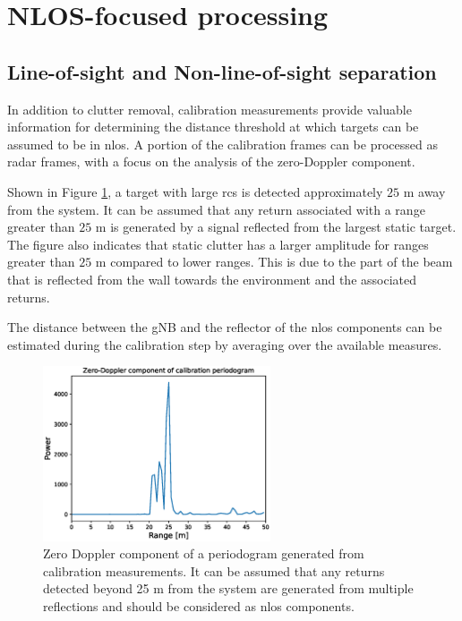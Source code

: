 	\section{NLOS-focused processing}
	\label{sec:nlos_proc_pipeline}
	
		\subsection{Line-of-sight and Non-line-of-sight separation}
		\label{sec:los_nlos_separation}
		
		
		
			In addition to clutter removal, calibration measurements provide valuable information for determining the distance threshold at which targets can be assumed to be in \gls{nlos}. 
			A portion of the calibration frames can be processed as radar frames, with a focus on the analysis of the zero-Doppler component.
			
			Shown in Figure \ref{fig:Test1_cali_static_per}, a target with large \gls{rcs} is detected approximately $25$ m away from the system. It can be assumed that any return associated with a range greater than $25$ m is generated by a signal reflected from the largest static target. The figure also indicates that static clutter has a larger amplitude for ranges greater than $25$ m compared to lower ranges. This is due to the part of the beam that is reflected from the wall towards the environment and the associated returns.
			
			The distance between the gNB and the reflector of the \gls{nlos} components can be estimated during the calibration step by averaging over the available measures.
			
			
			\begin{figure}[H]
				\centering
				\includegraphics[width=0.6\textwidth]{Images/Test1/cali_static_per_t1.eps}
				\caption{\small Zero Doppler component of a periodogram generated from calibration measurements. It can be assumed that any returns detected beyond 25 m from the system are generated from multiple reflections and should be considered as \gls{nlos} components. }
				\label{fig:Test1_cali_static_per}
			\end{figure}
		
